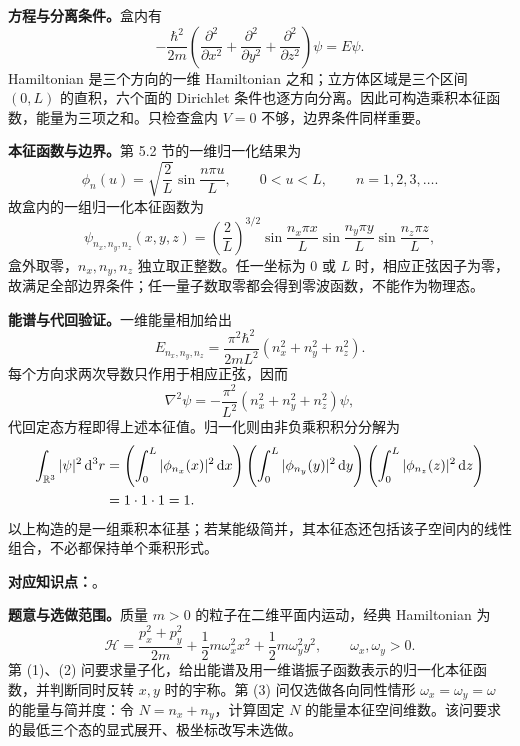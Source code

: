 \begin{checkedsolution}
\textbf{方程与分离条件。}盒内有
\begin{equation}
  -\frac{\hbar^2}{2m}\left(
    \frac{\partial^2}{\partial x^2}
    +\frac{\partial^2}{\partial y^2}
    +\frac{\partial^2}{\partial z^2}\right)\psi=E\psi.
\end{equation}
Hamiltonian 是三个方向的一维 Hamiltonian 之和；立方体区域是三个区间 $(0,L)$ 的直积，六个面的 Dirichlet 条件也逐方向分离。因此可构造乘积本征函数，能量为三项之和。只检查盒内 $V=0$ 不够，边界条件同样重要。

\textbf{本征函数与边界。}第 5.2 节的一维归一化结果为
\begin{equation}
  \phi_n(u)=\sqrt{\frac2L}\sin\frac{n\pi u}{L},
  \qquad 0<u<L,\qquad n=1,2,3,\ldots.
\end{equation}
故盒内的一组归一化本征函数为
\begin{equation}
  \boxed{\psi_{n_x,n_y,n_z}(x,y,z)
    =\left(\frac2L\right)^{3/2}
      \sin\frac{n_x\pi x}{L}
      \sin\frac{n_y\pi y}{L}
      \sin\frac{n_z\pi z}{L}},
\end{equation}
盒外取零，$n_x,n_y,n_z$ 独立取正整数。任一坐标为 $0$ 或 $L$ 时，相应正弦因子为零，故满足全部边界条件；任一量子数取零都会得到零波函数，不能作为物理态。

\textbf{能谱与代回验证。}一维能量相加给出
\begin{equation}
  \boxed{E_{n_x,n_y,n_z}
    =\frac{\pi^2\hbar^2}{2mL^2}(n_x^2+n_y^2+n_z^2)}.
\end{equation}
每个方向求两次导数只作用于相应正弦，因而
\begin{equation}
  \nabla^2\psi
    =-\frac{\pi^2}{L^2}(n_x^2+n_y^2+n_z^2)\psi,
\end{equation}
代回定态方程即得上述本征值。归一化则由非负乘积积分分解为
\begin{align}
  \int_{\mathbb{R}^3}|\psi|^2\mathop{}\!\mathrm{d}^3r
  &=\left(\int_0^L|\phi_{n_x}(x)|^2\mathop{}\!\mathrm{d} x\right)
    \left(\int_0^L|\phi_{n_y}(y)|^2\mathop{}\!\mathrm{d} y\right)
    \left(\int_0^L|\phi_{n_z}(z)|^2\mathop{}\!\mathrm{d} z\right)\notag\\
  &=1\cdot1\cdot1=1.
\end{align}
以上构造的是一组乘积本征基；若某能级简并，其本征态还包括该子空间内的线性组合，不必都保持单个乘积形式。
\end{checkedsolution}

\textbf{对应知识点：}。

\textbf{题意与选做范围。}质量 $m>0$ 的粒子在二维平面内运动，经典 Hamiltonian 为
\begin{equation}
  \mathcal H=\frac{p_x^2+p_y^2}{2m}
    +\frac12m\omega_x^2x^2+\frac12m\omega_y^2y^2,
  \qquad \omega_x,\omega_y>0.
\end{equation}
第 (1)、(2) 问要求量子化，给出能谱及用一维谐振子函数表示的归一化本征函数，并判断同时反转 $x,y$ 时的宇称。第 (3) 问仅选做各向同性情形 $\omega_x=\omega_y=\omega$ 的能量与简并度：令 $N=n_x+n_y$，计算固定 $N$ 的能量本征空间维数。该问要求的最低三个态的显式展开、极坐标改写未选做。

